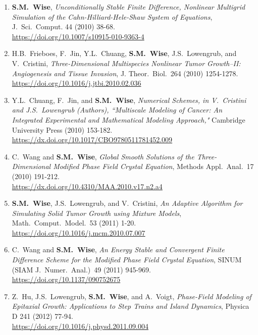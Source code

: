 \documentclass[11pt]{letter}
\begin{document}
\begin{enumerate}
    \item
\textbf{S.M.~Wise}, {\sl Unconditionally Stable Finite Difference, Nonlinear Multigrid Simulation of the Cahn-Hilliard-Hele-Shaw System of Equations}, J.~Sci.~Comput. 44 (2010) 38-68.
	\\
\url{https://doi.org/10.1007/s10915-010-9363-4}
	\item
H.B.~Frieboes, F.~Jin, Y.L.~Chuang, \textbf{S.M.~Wise}, J.S.~Lowengrub, and V.~Cristini, {\sl Three-Dimensional Multispecies Nonlinear Tumor Growth--II: Angiogenesis and Tissue Invasion}, J. Theor.~Biol.~264 (2010) 1254-1278.
	\\
\url{https://doi.org/10.1016/j.jtbi.2010.02.036}

	\item
Y.L.~Chuang, F.~Jin, and \textbf{S.M.~Wise}, {\sl Numerical Schemes, in V.~Cristini and J.S.~Lowengrub (Authors), ``Multiscale Modeling of Cancer: An Integrated Experimental and Mathematical Modeling Approach,"} Cambridge University Press (2010) 153-182.
	\\
\url{https://dx.doi.org/10.1017/CBO9780511781452.009}

	\item
C.~Wang and \textbf{S.M.~Wise}, {\sl Global Smooth Solutions of the Three-Dimensional Modified Phase Field Crystal Equation}, Methods Appl.~Anal.~17 (2010) 191-212.
	\\
\url{https://dx.doi.org/10.4310/MAA.2010.v17.n2.a4}

    \item
\textbf{S.M.~Wise}, J.S.~Lowengrub, and V.~Cristini, {\sl An Adaptive Algorithm for Simulating Solid Tumor Growth using Mixture Models}, Math.~Comput.~Model.~53 (2011) 1-20.
	\\
\url{https://doi.org/10.1016/j.mcm.2010.07.007}
 
	\item
C.~Wang and \textbf{S.M.~Wise}, {\sl An Energy Stable and Convergent Finite Difference Scheme for the Modified Phase Field Crystal Equation}, SINUM (SIAM J.~Numer.~Anal.)~49 (2011) 945-969.
	\\
\url{https://doi.org/10.1137/090752675}

	\item
Z.~Hu, J.S.~Lowengrub, \textbf{S.M.~Wise}, and A.~Voigt, {\sl Phase-Field Modeling of Epitaxial Growth: Applications to Step Trains and Island Dynamics}, Physica D 241 (2012) 77-94.
	\\
\url{https://doi.org/10.1016/j.physd.2011.09.004}


\end{enumerate}
\end{document}
